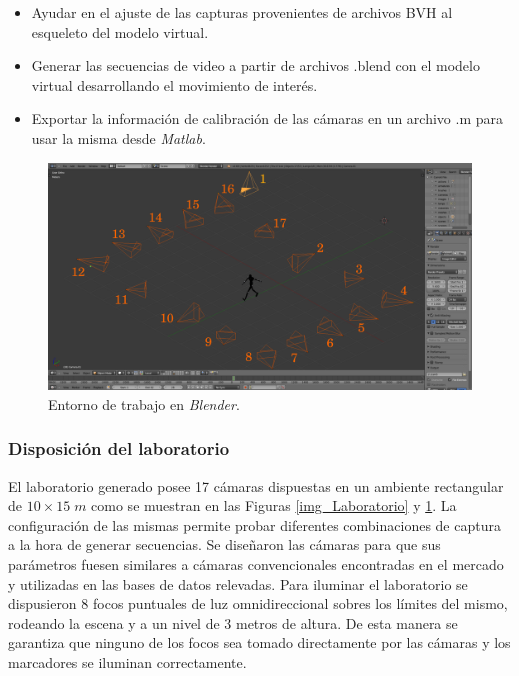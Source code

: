 \begin{itemize}
\item  Ayudar en  el ajuste de las capturas provenientes de archivos BVH al esqueleto del modelo virtual.
\item	Generar las secuencias de video a partir de archivos .blend  con el modelo virtual desarrollando el movimiento de interés.
\item	Exportar la información de calibración de las cámaras en un archivo .m para usar la misma desde \textit{Matlab}.
\end{itemize}


\begin{figure}[H]
  \hspace{-1.0cm}
   \includegraphics[scale=0.28]{img/Base_Datos/Entorno_Blender.pdf}
   \caption{Entorno de trabajo en \textit{Blender}.}
  \label{img_Entorno_Blender}
\end{figure}   


\subsubsection*{Disposición del laboratorio}
El laboratorio generado posee 17 cámaras dispuestas en un ambiente rectangular de $10\times15\;m $ como se muestran en las Figuras \ref{img_Laboratorio} y \ref{img_Entorno_Blender}. La configuración de las mismas permite probar diferentes combinaciones de captura a la hora de generar secuencias. Se diseñaron las cámaras para que sus parámetros fuesen similares a cámaras convencionales
 encontradas en el mercado y utilizadas en las bases de datos relevadas. 
Para iluminar el laboratorio se dispusieron $8$ focos puntuales de luz omnidireccional sobres los límites del mismo, rodeando la escena y a un nivel de 3 metros de altura. De esta manera se garantiza que ninguno de los focos sea tomado directamente por las cámaras y los marcadores se iluminan correctamente.
 

